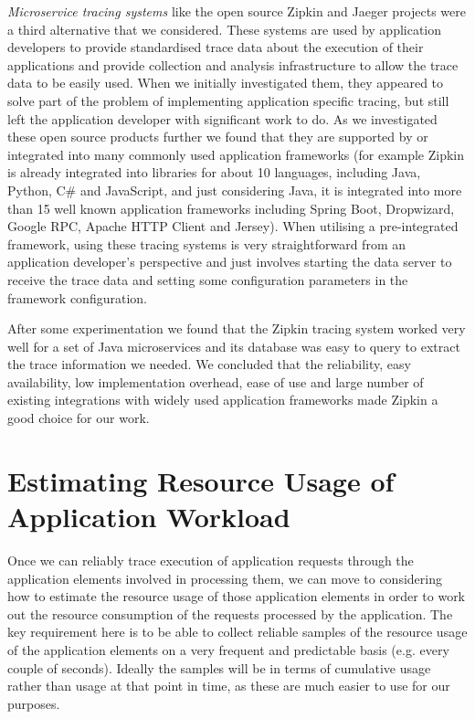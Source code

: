 \emph{Microservice tracing systems} like the open source Zipkin and Jaeger \cite{zipkin2018, jaeger2018} projects were a third alternative that we considered.  These systems are used by application developers to provide standardised trace data about the execution of their applications and provide collection and analysis infrastructure to allow the trace data to be easily used.  When we initially investigated them, they appeared to solve part of the problem of implementing application specific tracing, but still left the application developer with significant work to do.  As we investigated these open source products further we found that they are supported by or integrated into many commonly used application frameworks (for example Zipkin is already integrated into libraries for about 10 languages, including Java, Python, C\# and JavaScript, and just considering Java, it is integrated into more than 15 well known application frameworks including Spring Boot, Dropwizard, Google RPC, Apache HTTP Client and Jersey).  When utilising a pre-integrated framework, using these tracing systems is very straightforward from an application developer's perspective and just involves starting the data server to receive the trace data and setting some configuration parameters in the framework configuration.

After some experimentation we found that the Zipkin tracing system worked very well for a set of Java microservices and its database was easy to query to extract the trace information we needed.  We concluded that the reliability, easy availability, low implementation overhead, ease of use and large number of existing integrations with widely used application frameworks made Zipkin a good choice for our work.

\section{Estimating Resource Usage of Application Workload}
\label{section:resusageofappworkload}

Once we can reliably trace execution of application requests through the application elements involved in processing them, we can move to considering how to estimate the resource usage of those application elements in order to work out the resource consumption of the requests processed by the application.  The key requirement here is to be able to collect reliable samples of the resource usage of the application elements on a very frequent and predictable basis (e.g. every couple of seconds).  Ideally the samples will be in terms of cumulative usage rather than usage at that point in time, as these are much easier to use for our purposes.

